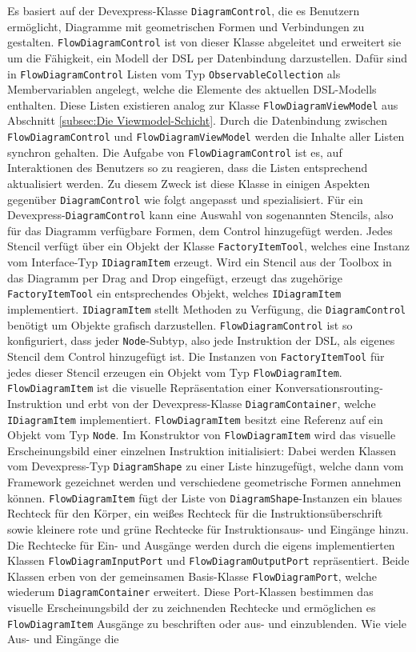 \noindent Es basiert auf der Devexpress-Klasse \texttt{DiagramControl}, die es Benutzern ermöglicht, Diagramme mit geometrischen Formen und Verbindungen zu gestalten. \texttt{Flow\-Dia\-gram\-Con\-trol} ist von dieser Klasse abgeleitet und erweitert sie um die Fähigkeit, ein Modell der DSL per Datenbindung darzustellen. Dafür sind in \texttt{FlowDiagramControl} Listen vom Typ \texttt{ObservableCollection} als Membervariablen angelegt, welche die Elemente des aktuellen DSL-Modells enthalten. Diese Listen existieren analog zur Klasse \texttt{FlowDiagramViewModel} aus Abschnitt \ref{subsec:Die Viewmodel-Schicht}. Durch die Datenbindung zwischen \texttt{FlowDiagramControl} und \texttt{FlowDiagramViewModel} werden die Inhalte aller Listen synchron gehalten. Die Aufgabe von \texttt{FlowDiagramControl} ist es, auf Interaktionen des Benutzers so zu reagieren, dass die Listen entsprechend aktualisiert werden. Zu diesem Zweck ist diese Klasse in einigen Aspekten gegenüber \texttt{DiagramControl} wie folgt angepasst und spezialisiert. Für ein Devexpress-\texttt{DiagramControl} kann eine Auswahl von sogenannten Stencils, also für das Diagramm verfügbare Formen, dem Control hinzugefügt werden. Jedes Stencil verfügt über ein Objekt der Klasse \texttt{FactoryItemTool}, welches eine Instanz vom Interface-Typ \texttt{IDiagramItem} erzeugt. Wird ein Stencil aus der Toolbox in das Diagramm per Drag and Drop eingefügt, erzeugt das zugehörige \texttt{FactoryItemTool} ein entsprechendes Objekt, welches \texttt{IDiagramItem} implementiert. \texttt{IDiagramItem} stellt Methoden zu Verfügung, die \texttt{DiagramControl} benötigt um Objekte grafisch darzustellen. \texttt{FlowDiagramControl} ist so konfiguriert, dass jeder \texttt{Node}-Subtyp, also jede Instruktion der DSL, als eigenes Stencil dem Control hinzugefügt ist. Die Instanzen von \texttt{FactoryItemTool} für jedes dieser Stencil erzeugen ein Objekt vom Typ \texttt{FlowDiagramItem}. \texttt{Flow\-Dia\-gram\-Item} ist die visuelle Repräsentation einer Konversationsrouting-Instruktion und erbt von der Devexpress-Klasse \texttt{DiagramContainer}, welche \texttt{IDiagramItem} implementiert. \texttt{Flow\-Dia\-gram\-Item} besitzt eine Referenz auf ein Objekt vom Typ \texttt{Node}. Im Konstruktor von \texttt{FlowDiagramItem} wird das visuelle Erscheinungsbild einer einzelnen Instruktion initialisiert: Dabei werden Klassen vom Devexpress-Typ \texttt{DiagramShape} zu einer Liste hinzugefügt, welche dann vom Framework gezeichnet werden und verschiedene geometrische Formen annehmen können. \texttt{Flow\-Dia\-gram\-Item} fügt der Liste von \texttt{DiagramShape}-Instanzen ein blaues Rechteck für den Körper, ein weißes Rechteck für die Instruktionsüberschrift sowie kleinere rote und grüne Rechtecke für Instruktionsaus- und Eingänge hinzu. Die Rechtecke für Ein- und Ausgänge werden durch die eigens implementierten Klassen \texttt{FlowDiagramInputPort} und \texttt{FlowDiagramOutputPort} repräsentiert. Beide Klassen erben von der gemeinsamen Basis-Klasse \texttt{Flow\-Dia\-gram\-Port}, welche wiederum \texttt{DiagramContainer} erweitert. Diese Port-Klassen bestimmen das visuelle Erscheinungsbild der zu zeichnenden Rechtecke und ermöglichen es \texttt{FlowDiagramItem} Ausgänge zu beschriften oder aus- und einzublenden. Wie viele Aus- und Eingänge die 
